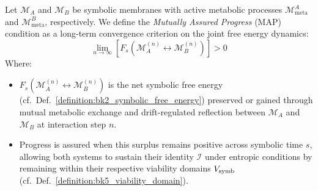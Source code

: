 \begin{definition}
\label{definition:bk5_mutually_assured_progress}
Let $\mathscr{M}_A$ and $\mathscr{M}_B$ be symbolic membranes with active metabolic processes $\mathcal{M}_{\text{meta}}^A$ and $\mathcal{M}_{\text{meta}}^B$, respectively. We define the \emph{Mutually Assured Progress} (MAP) condition as a long-term convergence criterion on the joint free energy dynamics:
\begin{equation}
\lim_{n \to \infty} \left[ F_s(\mathscr{M}_A^{(n)} \leftrightarrow \mathscr{M}_B^{(n)}) \right] > 0
\end{equation}
Where:
\begin{itemize}
  \item $F_s(\mathscr{M}_A^{(n)} \leftrightarrow \mathscr{M}_B^{(n)})$ is the net symbolic free energy (cf.~Def.~\ref{definition:bk2_symbolic_free_energy}) preserved or gained through mutual metabolic exchange and drift-regulated reflection between $\mathscr{M}_A$ and $\mathscr{M}_B$ at interaction step $n$.
  \item Progress is assured when this surplus remains positive across symbolic time $s$, allowing both systems to sustain their identity $\mathcal{I}$ under entropic conditions by remaining within their respective viability domains $V_{\mathrm{symb}}$ (cf.~Def.~\ref{definition:bk5_viability_domain}).
\end{itemize}
\end{definition}

